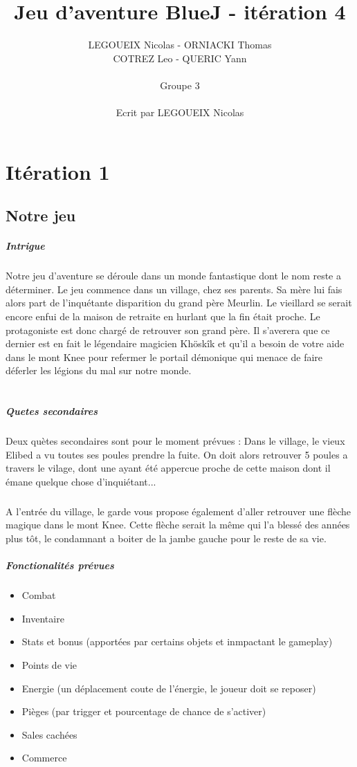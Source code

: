 \documentclass[11pt,a4paper]{report}
\author{LEGOUEIX Nicolas - ORNIACKI Thomas\\ COTREZ Leo - QUERIC Yann\\~\\ Groupe 3\\~\\Ecrit par LEGOUEIX Nicolas}
\title{Jeu d'aventure BlueJ - itération 4}
\begin{document}
\maketitle
\tableofcontents
\chapter{Itération 1}
\section{Notre jeu}
\paragraph{Intrigue}
Notre jeu d'aventure se déroule dans un monde fantastique dont le nom reste a déterminer. Le jeu commence dans un village, chez ses parents. Sa mère lui fais alors part de l'inquétante disparition du grand père Meurlin. Le vieillard se serait encore enfui de la maison de retraite en hurlant que la fin était proche. Le protagoniste est donc chargé de retrouver son grand père. Il s'averera que ce dernier est en fait le légendaire magicien Khöskîk et qu'il a besoin de votre aide dans le mont Knee pour refermer le portail démonique qui menace de faire déferler les légions du mal sur notre monde.\\~\\
\paragraph{Quetes secondaires}
Deux quètes secondaires sont pour le moment prévues : Dans le village, le vieux Elibed a vu toutes ses poules prendre la fuite. On doit alors retrouver 5 poules a travers le vilage, dont une ayant été appercue proche de cette maison dont il émane quelque chose d'inquiétant...
\paragraph{}
A l'entrée du village, le garde vous propose également d'aller retrouver une flèche magique dans le mont Knee. Cette flèche serait la même qui l'a blessé des années plus tôt, le condamnant a boiter de la jambe gauche pour le reste de sa vie.
\paragraph{Fonctionalités prévues}
\begin{itemize}
\item Combat
\item Inventaire
\item Stats et bonus (apportées par certains objets et inmpactant le gameplay)
\item Points de vie
\item Energie (un déplacement coute de l'énergie, le joueur doit se reposer)
\item Pièges (par trigger et pourcentage de chance de s'activer)
\item Sales cachées
\item Commerce
\end{itemize}
\end{document}
